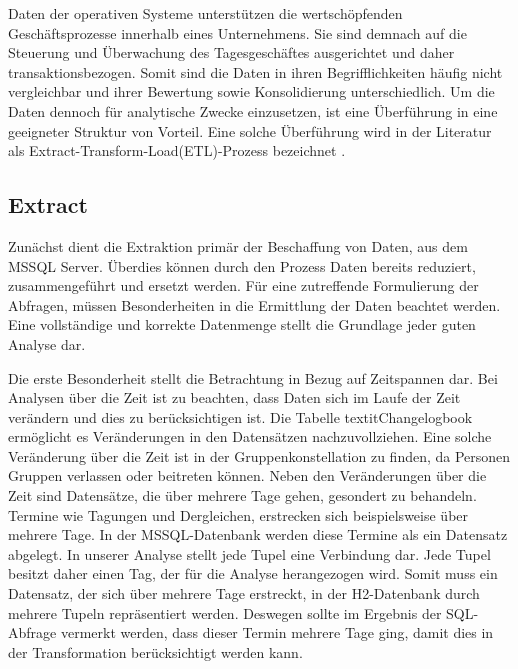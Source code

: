 Daten der operativen Systeme unterstützen die wertschöpfenden Geschäftsprozesse innerhalb eines Unternehmens. Sie sind demnach auf die Steuerung und Überwachung des Tagesgeschäftes ausgerichtet und daher transaktionsbezogen. Somit sind die Daten in ihren Begrifflichkeiten häufig nicht vergleichbar und ihrer Bewertung sowie Konsolidierung unterschiedlich. Um die Daten dennoch für analytische Zwecke einzusetzen, ist eine Überführung in eine geeigneter Struktur von Vorteil. Eine solche Überführung wird in der Literatur als Extract-Transform-Load(ETL)-Prozess bezeichnet \cite{ElSappagh201191}. 

\subsection{Extract}

Zunächst dient die Extraktion primär der Beschaffung von Daten, aus dem MSSQL Server. Überdies können durch den Prozess Daten bereits reduziert,  zusammengeführt und ersetzt werden. Für eine zutreffende Formulierung der Abfragen, müssen Besonderheiten in die Ermittlung der Daten beachtet werden. Eine vollständige und korrekte Datenmenge stellt die Grundlage jeder guten Analyse dar.

Die erste Besonderheit stellt die Betrachtung in Bezug auf Zeitspannen dar. Bei Analysen über die Zeit ist zu beachten, dass Daten sich im Laufe der Zeit verändern und dies zu berücksichtigen ist. Die Tabelle textit{Changelogbook} ermöglicht es Veränderungen in den Datensätzen nachzuvollziehen. Eine solche Veränderung über die Zeit ist in der Gruppenkonstellation zu finden, da Personen Gruppen verlassen oder beitreten können. Neben den Veränderungen über die Zeit sind Datensätze, die über mehrere Tage gehen, gesondert zu behandeln. Termine wie Tagungen und Dergleichen, erstrecken sich beispielsweise über mehrere Tage. In der MSSQL-Datenbank werden diese Termine als ein Datensatz abgelegt. In unserer Analyse stellt jede Tupel eine Verbindung dar. Jede Tupel besitzt daher einen Tag, der für die Analyse herangezogen wird. Somit muss ein Datensatz, der sich über mehrere Tage erstreckt, in der H2-Datenbank durch mehrere Tupeln repräsentiert werden. Deswegen sollte im Ergebnis der SQL-Abfrage vermerkt werden, dass dieser Termin mehrere Tage ging, damit dies in der Transformation berücksichtigt werden kann. 

